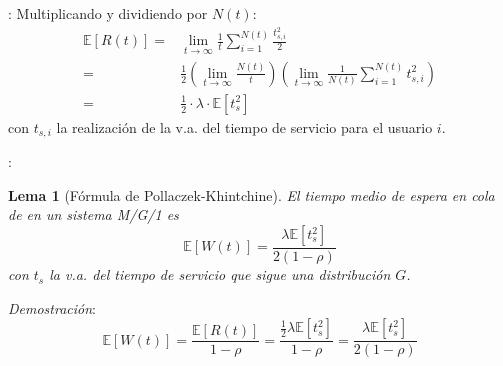 \documentclass[xcolor={x11names}]{beamer}
\newtheorem{lema}{Lema}[section]
\begin{document}
\begin{frame}{\secname: \subsecname}
    Multiplicando y dividiendo por
    $N(t)$:
    \begin{align*}
        \mathbb{E}[R(t)]
        =& \lim_{t\to\infty}\frac{1}{t}
        \sum_{i=1}^{N(t)} \frac{t_{s,i}^2}{2}\\
        =& \frac{1}{2}
        \left( \lim_{t\to\infty} \frac{N(t)}{t}
        \right)
        \left( \lim_{t\to\infty} \frac{1}{N(t)}
        \sum_{i=1}^{N(t)} t_{s,i}^2
        \right)\\
        =& \frac{1}{2} \cdot \lambda\cdot
        \mathbb{E}[t_s^2]
    \end{align*}
    con $t_{s,i}$ la realización
    de la v.a. del tiempo de servicio
    para el usuario $i$.
\end{frame}



\begin{frame}{\secname: \subsecname}
    \begin{lema}[Fórmula de Pollaczek-Khintchine]
        El tiempo medio de espera en cola
        de en un sistema M/G/1 es
        \begin{equation}
            \mathbb{E}[W(t)]=
            \frac{\lambda\mathbb{E}[t_s^2]}{2(1-\rho)}
        \end{equation}
        con $t_s$ la v.a. del tiempo de
        servicio que sigue una distribución
        $G$.
    \end{lema}
    \textit{Demostración}:
    \begin{equation*}
        \mathbb{E}[W(t)]
        =\frac{\mathbb{E}[R(t)]}{1-\rho}
        =\frac{\tfrac{1}{2}\lambda\mathbb{E}[t_s^2]}{1-\rho}
        =\frac{\lambda\mathbb{E}[t_s^2]}{2(1-\rho)}
    \end{equation*}

\end{frame}
\end{document}
